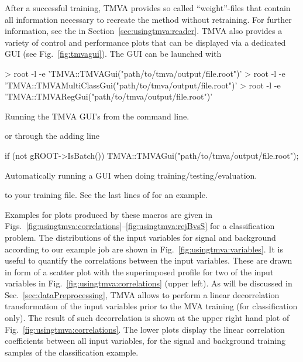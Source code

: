After a successful training, TMVA provides so called ``weight''-files that contain all information necessary to recreate the method without retraining. For further information, see the  in Section~\ref{sec:usingtmva:reader}. TMVA also provides a variety of control and performance plots that can be displayed via a dedicated GUI (see Fig.~\ref{fig:tmvagui}). The GUI can be launched with 
\begin{codeexample}\begin{tmvacode}
> root -l -e 'TMVA::TMVAGui("path/to/tmva/output/file.root")'
> root -l -e 'TMVA::TMVAMultiClassGui("path/to/tmva/output/file.root")'
> root -l -e 'TMVA::TMVARegGui("path/to/tmva/output/file.root")'
\end{tmvacode}
\caption[.]{\codeexampleCaptionSize Running the TMVA GUI's from the command line.}
\end{codeexample}
or through the adding line 
\begin{codeexample}\begin{tmvacode}
if (not gROOT->IsBatch()) {
   TMVA::TMVAGui("path/to/tmva/output/file.root");
}
\end{tmvacode}
\caption[.]{\codeexampleCaptionSize Automatically running a GUI when doing training/testing/evaluation.}
\end{codeexample}
to your training file. See the last lines of  for an example.

 
Examples for plots produced by these macros are given in 
Figs.~\ref{fig:usingtmva:correlations}--\ref{fig:usingtmva:rejBvsS} for a 
classification problem.
The distributions of the input variables for signal and background 
according to our example job are shown in Fig.~\ref{fig:usingtmva:variables}. 
It is useful to quantify the correlations between the input variables.
These are drawn in form of a scatter plot with the superimposed profile for
two of the input variables in Fig.~\ref{fig:usingtmva:correlations} (upper left).  
As will be discussed in Sec.~\ref{sec:dataPreprocessing}, TMVA allows to perform 
a linear decorrelation transformation of the input variables prior to the MVA
training (for classification only). The result of such decorrelation is shown 
at the upper right hand plot of Fig.~\ref{fig:usingtmva:correlations}. The lower 
plots display the linear correlation coefficients between all input variables, 
for the signal and background training samples of the classification example.

